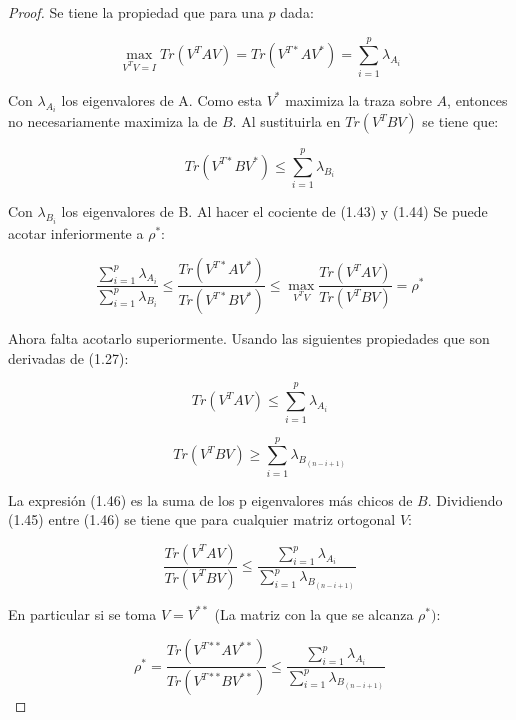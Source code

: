 \begin{proof}
Se tiene la propiedad que para una $p$ dada:


\begin{equation}\label{eq:2.44}
\max_{V^T V = I} Tr(V^T A V) =  Tr(V^{T*} A V^*) = \sum_{i=1}^p \lambda_{A_i }
\end{equation}
 
Con $\lambda_{A_i}$ los eigenvalores de A. Como esta $V^*$ maximiza la traza sobre $A$, entonces no necesariamente maximiza la de $B$. Al sustituirla en $Tr(V^{T} B V)$ se tiene que: 

\begin{equation}\label{eq:2.45}
Tr(V^{T*} B V^*) \leq \sum_{i=1}^p \lambda_{B_i }
\end{equation}

Con $\lambda_{B_i}$ los eigenvalores de B. Al hacer el cociente de (1.43) y (1.44) Se puede acotar inferiormente a $\rho^*$:


\begin{equation*}
  \frac{\sum_{i=1}^p \lambda_{A_i}} {\sum_{i=1}^p \lambda_{B_i}} \leq \frac{Tr(V^{T*} A V^*)}{Tr(V^{T*} B V^*)} \leq \max_{V^T V} \frac{Tr(V^{T} A V)}{Tr(V^{T} B V)} = \rho^*
\end{equation*}

Ahora falta acotarlo superiormente. Usando las siguientes propiedades que son derivadas de (1.27):

\begin{equation}\label{eq:2.46}
  Tr(V^T A V) \leq \sum_{i=1}^p \lambda_{A_i} 
\end{equation}

\begin{equation}\label{eq:2.47}
  Tr(V^T B V) \geq \sum_{i=1}^p \lambda_{B_{(n-i+1)}}
\end{equation}

La expresión (1.46) es la suma de los p eigenvalores más chicos de $B$. Dividiendo (1.45) entre (1.46) se tiene que para cualquier matriz ortogonal $V$:

\begin{equation}\label{eq:2.48}
   \frac{Tr(V^{T} A V)}{Tr(V^{T} B V)} \leq \frac{\sum_{i=1}^p \lambda_{A_i}}{\sum_{i=1}^p \lambda_{B_{(n-i+1)}}}
\end{equation}

En particular si se toma $V = V^{**}$ (La matriz con la que se alcanza $\rho^*)$:

\begin{equation}\label{eq:2.49}
  \rho^* = \frac{Tr(V^{T**} A V^{**})}{Tr(V^{T**} B V^{**})} \leq \frac{\sum_{i=1}^p \lambda_{A_i}}{\sum_{i=1}^p \lambda_{B_{(n-i+1)}}}
\end{equation}

\end{proof}
